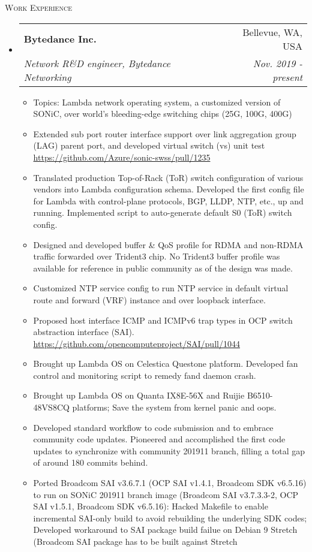 \documentclass[letterpaper,11pt]{article}
\makeatletter
\newcommand{\resheading}[1]{{\noindent\large \colorbox{mygrey}{
\begin{minipage}{1.0\textwidth}{\textsc{#1 \vphantom{p\^{E}}}}\end{minipage}}}}
\newcommand{\ressubheading}[4]{
\begin{tabular*}{6.69in}{l@{\extracolsep{\fill}}r}
        \textbf{#1} & #2 \\
        \textit{#3} & \textit{#4} \\
\end{tabular*}\vspace{-6pt}
}
\newcommand{\resitem}[1]{\item #1 \vspace{-2pt}}
\makeatother
\begin{document}
\resheading{Work Experience}%
\begin{itemize}
\setlength{\itemindent}{-0.075in}

\item
  \ressubheading{Bytedance Inc.}{Bellevue, WA, USA}
  {Network R\&D engineer, Bytedance Networking}{Nov. 2019 - present}
  \begin{itemize}
  \resitem{Topics: Lambda network operating system, a customized version of SONiC, over world's bleeding-edge switching chips (25G, 100G, 400G)}
  \resitem{Extended sub port router interface support over link aggregation group (LAG) parent port,
  and developed virtual switch (vs) unit test \url{https://github.com/Azure/sonic-swss/pull/1235}}
  \resitem{Translated production Top-of-Rack (ToR) switch configuration of various vendors into Lambda configuration schema.
  Developed the first config file for Lambda with control-plane protocols, BGP, LLDP, NTP, etc., up and running.
  Implemented script to auto-generate default S0 (ToR) switch config.}
  \resitem{Designed and developed buffer \& QoS profile for RDMA and non-RDMA traffic forwarded over Trident3 chip.
  No Trident3 buffer profile was available for reference in public community as of the design was made.}
  \resitem{Customized NTP service config to run NTP service in default virtual route and forward (VRF) instance and over loopback interface.}
  \resitem{Proposed host interface ICMP and ICMPv6 trap types in OCP switch abstraction interface (SAI).
  \url{https://github.com/opencomputeproject/SAI/pull/1044}}
  \resitem{Brought up Lambda OS on Celestica Questone platform. Developed fan control and monitoring script to remedy fand daemon crash.}
  \resitem{Brought up Lambda OS on Quanta IX8E-56X and Ruijie B6510-48VS8CQ platforms; Save the system from kernel panic and oops.}
  \resitem{Developed standard workflow to code submission and to embrace community code updates.
  Pioneered and accomplished the first code updates to synchronize with community 201911 branch, filling a total gap of around 180 commits behind.}
  \resitem{Ported Broadcom SAI v3.6.7.1 (OCP SAI v1.4.1, Broadcom SDK v6.5.16) to run on SONiC 201911 branch image
  (Broadcom SAI v3.7.3.3-2, OCP SAI v1.5.1, Broadcom SDK v6.5.16):
  Hacked Makefile to enable incremental SAI-only build to avoid rebuilding the underlying SDK codes;
  Developed workaround to SAI package build failue on Debian 9 Stretch (Broadcom SAI package has to be built against Stretch
}
\end{itemize}
\end{itemize}
\end{document}
